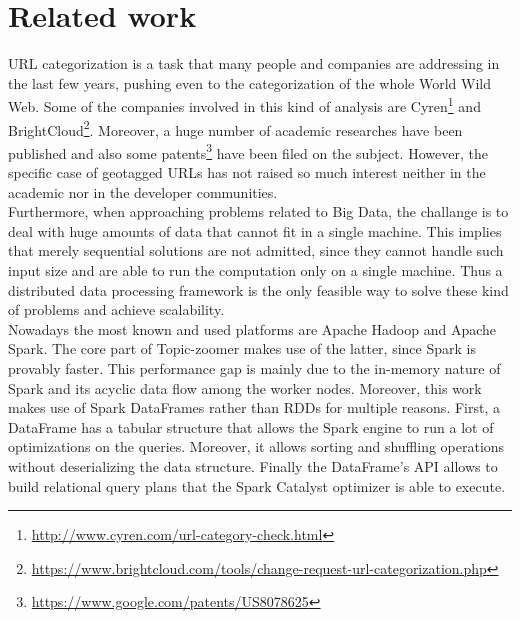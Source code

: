 \documentclass{sig-alternate-05-2015}
\begin{document}
\section{Related work}
URL categorization is a task that many people and companies are addressing in the last few years, pushing even to the categorization of the whole World Wild Web. Some of the companies involved in this kind of analysis are Cyren\footnote{\url{http://www.cyren.com/url-category-check.html}} and BrightCloud\footnote{\url{https://www.brightcloud.com/tools/change-request-url-categorization.php}}. Moreover, a huge number of academic researches have been published and also some patents\footnote{\url{https://www.google.com/patents/US8078625}} have been filed on the subject. However, the specific case of geotagged URLs has not raised so much interest neither in the academic nor in the developer communities.\\
Furthermore, when approaching problems related to Big Data, the challange is to deal with huge amounts of data that cannot fit in a single machine. This implies that merely sequential solutions are not admitted, since they cannot handle such input size and are able to run the computation only on a single machine. Thus a distributed data processing framework is the only feasible way to solve these kind of problems and achieve scalability\cite{scalability_performances}.\\
Nowadays the most known and used platforms are Apache Hadoop and Apache Spark. The core part of Topic-zoomer makes use of the latter, since Spark is provably faster\cite{evaluation, evaluation2}. This performance gap is mainly due to the in-memory nature of Spark and its acyclic data flow among the worker nodes. Moreover, this work makes use of Spark DataFrames rather than RDDs for multiple reasons. First, a DataFrame has a tabular structure that allows the Spark engine to run a lot of optimizations on the queries. Moreover, it allows sorting and shuffling operations without deserializing the data structure. Finally the DataFrame's API allows to build relational query plans\cite{relational_query} that the Spark Catalyst optimizer is able to execute.
\end{document}
